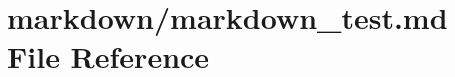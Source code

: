 \hypertarget{markdown__test_8md}{}\section{markdown/markdown\+\_\+test.md File Reference}
\label{markdown__test_8md}
